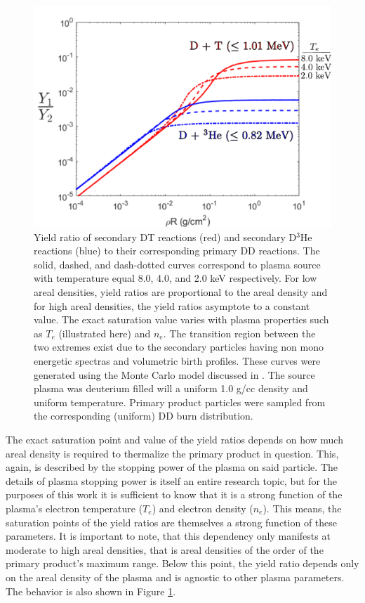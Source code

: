 	\begin{figure}[h!]
		\centering
		\includegraphics[scale=0.6]{Figures/yieldRatio.pdf}
		\caption[Secondary Product  Yield Ratios]{Yield ratio of secondary DT reactions (red) and secondary D$^3$He reactions (blue) to their corresponding primary DD reactions. The solid, dashed, and dash-dotted curves correspond to plasma source with temperature equal 8.0, 4.0, and 2.0 keV respectively. For low areal densities, yield ratios are proportional to the areal density and for high areal densities, the yield ratios asymptote to a constant value. The exact saturation value varies with plasma properties such as $T_e$ (illustrated here) and $n_e$. The transition region between the two extremes exist due to the secondary particles having non mono energetic spectras and volumetric birth profiles. These curves were generated using the Monte Carlo model discussed in . The source plasma was deuterium filled will a uniform 1.0 g/cc density and uniform temperature. Primary product particles were sampled from the corresponding (uniform) DD burn distribution.  }
		\label{yieldRatioCurves}
	\end{figure}

	

	The exact saturation point and value of the yield ratios depends on how much areal density is required to thermalize the primary product in question. This, again, is described by the stopping power of the plasma on said particle. The details of plasma stopping power is itself an entire research topic, but for the purposes of this work it is sufficient to know that it is a strong function of the plasma's electron temperature ($T_e$) and electron density ($n_e$). This means, the saturation points of the yield ratios are themselves a strong function of these parameters. It is important to note, that this dependency only manifests at moderate to high areal densities, that is areal densities of the order of the primary product's maximum range. Below this point, the yield ratio depends only on the areal density of the plasma and is agnostic to other plasma parameters. The behavior is also shown in Figure \ref{yieldRatioCurves}.
	
